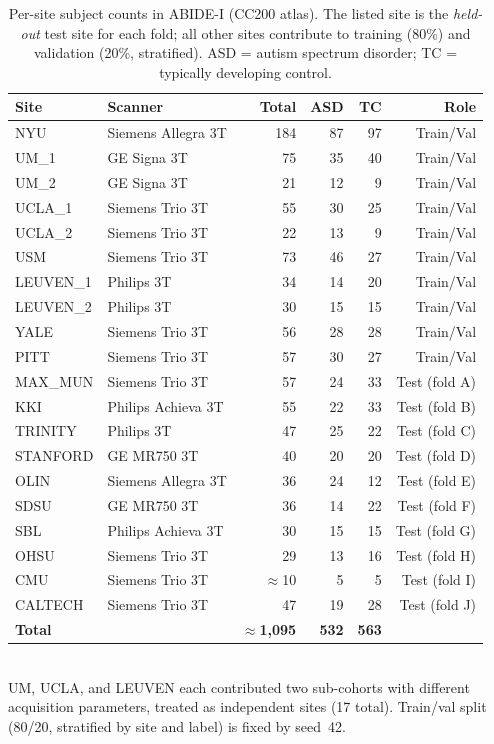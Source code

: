 \documentclass[runningheads]{llncs}
\begin{document}
\begin{table}[t]
\centering
\caption{Per-site subject counts in ABIDE-I (CC200 atlas). The listed site is the \emph{held-out} test site for each fold; all other sites contribute to training (80\%) and validation (20\%, stratified). ASD = autism spectrum disorder; TC = typically developing control.}
\label{tab:folds}
\setlength{\tabcolsep}{4pt}
\small
\begin{tabular}{llrrrr}
\toprule
Site & Scanner & Total & ASD & TC & Role \\
\midrule
NYU       & Siemens Allegra 3T  & 184          & 87 & 97 & Train/Val \\
UM\_1     & GE Signa 3T         & 75           & 35 & 40 & Train/Val \\
UM\_2     & GE Signa 3T         & 21           & 12 & 9  & Train/Val \\
UCLA\_1   & Siemens Trio 3T     & 55           & 30 & 25 & Train/Val \\
UCLA\_2   & Siemens Trio 3T     & 22           & 13 & 9  & Train/Val \\
USM       & Siemens Trio 3T     & 73           & 46 & 27 & Train/Val \\
LEUVEN\_1 & Philips 3T          & 34           & 14 & 20 & Train/Val \\
LEUVEN\_2 & Philips 3T          & 30           & 15 & 15 & Train/Val \\
YALE      & Siemens Trio 3T     & 56           & 28 & 28 & Train/Val \\
PITT      & Siemens Trio 3T     & 57           & 30 & 27 & Train/Val \\
\midrule
MAX\_MUN  & Siemens Trio 3T     & 57           & 24 & 33 & Test (fold A) \\
KKI       & Philips Achieva 3T  & 55           & 22 & 33 & Test (fold B) \\
TRINITY   & Philips 3T          & 47           & 25 & 22 & Test (fold C) \\
STANFORD  & GE MR750 3T         & 40           & 20 & 20 & Test (fold D) \\
OLIN      & Siemens Allegra 3T  & 36           & 24 & 12 & Test (fold E) \\
SDSU      & GE MR750 3T         & 36           & 14 & 22 & Test (fold F) \\
SBL       & Philips Achieva 3T  & 30           & 15 & 15 & Test (fold G) \\
OHSU      & Siemens Trio 3T     & 29           & 13 & 16 & Test (fold H) \\
CMU       & Siemens Trio 3T     & $\approx$10  & 5  & 5  & Test (fold I) \\
CALTECH   & Siemens Trio 3T     & 47           & 19 & 28 & Test (fold J) \\
\midrule
\textbf{Total} & & $\approx$\textbf{1{,}095} & \textbf{532} & \textbf{563} & \\
\bottomrule
\end{tabular}
\\[3pt]
{\footnotesize UM, UCLA, and LEUVEN each contributed two sub-cohorts with different acquisition parameters, treated as independent sites (17 total). Train/val split (80/20, stratified by site and label) is fixed by seed~42.}
\end{table}
\end{document}
